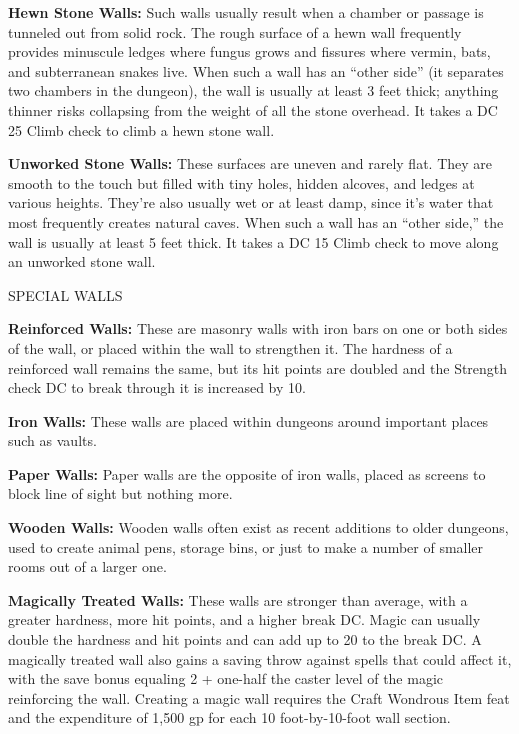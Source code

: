 \documentclass{article}
\begin{document}
\textbf{Hewn Stone Walls:} Such walls usually result when a chamber or passage 
is tunneled out from solid rock. The rough surface of a hewn wall frequently provides 
minuscule ledges where fungus grows and fissures where vermin, bats, and subterranean 
snakes live. When such a wall has an ``other side'' (it separates two chambers 
in the dungeon), the wall is usually at least 3 feet thick; anything thinner risks 
collapsing from the weight of all the stone overhead. It takes a DC 25 Climb check 
to climb a hewn stone wall.

\textbf{Unworked Stone Walls:} These surfaces are uneven and rarely flat. They 
are smooth to the touch but filled with tiny holes, hidden alcoves, and ledges 
at various heights. They're also usually wet or at least damp, since it's water 
that most frequently creates natural caves. When such a wall has an ``other side,'' 
the wall is usually at least 5 feet thick. It takes a DC 15 Climb check to move 
along an unworked stone wall. 

\vspace{12pt}
SPECIAL WALLS

\textbf{Reinforced Walls:}\textit{ }These are masonry walls with iron bars on one 
or both sides of the wall, or placed within the wall to strengthen it. The hardness 
of a reinforced wall remains the same, but its hit points are doubled and the Strength 
check DC to break through it is increased by 10.

\textbf{Iron Walls: }These walls are placed within dungeons around important places 
such as vaults. 

\textbf{Paper Walls:}\textit{ }Paper walls are the opposite of iron walls, placed 
as screens to block line of sight but nothing more.

\textbf{Wooden Walls:}\textit{ }Wooden walls often exist as recent additions to 
older dungeons, used to create animal pens, storage bins, or just to make a number 
of smaller rooms out of a larger one.

\textbf{Magically Treated Walls:}\textit{ }These walls are stronger than average, 
with a greater hardness, more hit points, and a higher break DC. Magic can usually 
double the hardness and hit points and can add up to 20 to the break DC. A magically 
treated wall also gains a saving throw against spells that could affect it, with 
the save bonus equaling 2 + one-half the caster level of the magic reinforcing 
the wall. Creating a magic wall requires the Craft Wondrous Item feat and the expenditure 
of 1,500 gp for each 10 foot-by-10-foot wall section.
\end{document}
